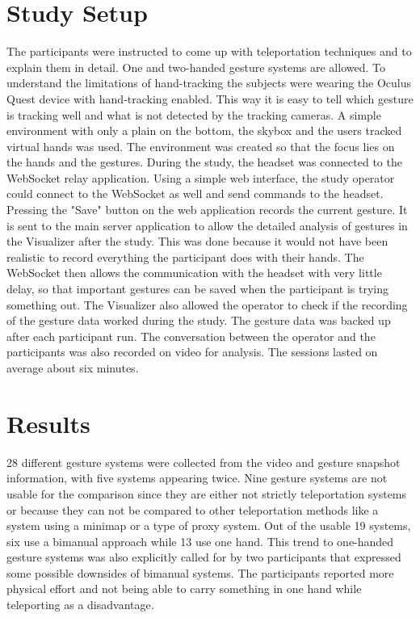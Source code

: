 \section{Study Setup}
The participants were instructed to come up with teleportation techniques and to explain them in detail. One and two-handed gesture systems are allowed. To understand the limitations of hand-tracking the subjects were wearing the Oculus Quest device with hand-tracking enabled. This way it is easy to tell which gesture is tracking well and what is not detected by the tracking cameras. A simple environment with only a plain on the bottom, the skybox and the users tracked virtual hands was used. The environment was created so that the focus lies on the hands and the gestures. During the study, the headset was connected to the WebSocket relay application. Using a simple web interface, the study operator could connect to the WebSocket as well and send commands to the headset. Pressing the "Save" button on the web application records the current gesture. It is sent to the main server application to allow the detailed analysis of gestures in the Visualizer after the study. This was done because it would not have been realistic to record everything the participant does with their hands. The WebSocket then allows the communication with the headset with very little delay, so that important gestures can be saved when the participant is trying something out. The Visualizer also allowed the operator to check if the recording of the gesture data worked during the study. The gesture data was backed up after each participant run. The conversation between the operator and the participants was also recorded on video for analysis. The sessions lasted on average about six minutes.


\section{Results}
$28$ different gesture systems were collected from the video and gesture snapshot information, with five systems appearing twice. Nine gesture systems are not usable for the comparison since they are either not strictly teleportation systems or because they can not be compared to other teleportation methods like a system using a minimap or a type of proxy system. Out of the usable 19 systems, six use a bimanual approach while 13 use one hand. This trend to one-handed gesture systems was also explicitly called for by two participants that expressed some possible downsides of bimanual systems. The participants reported more physical effort and not being able to carry something in one hand while teleporting as a disadvantage.

